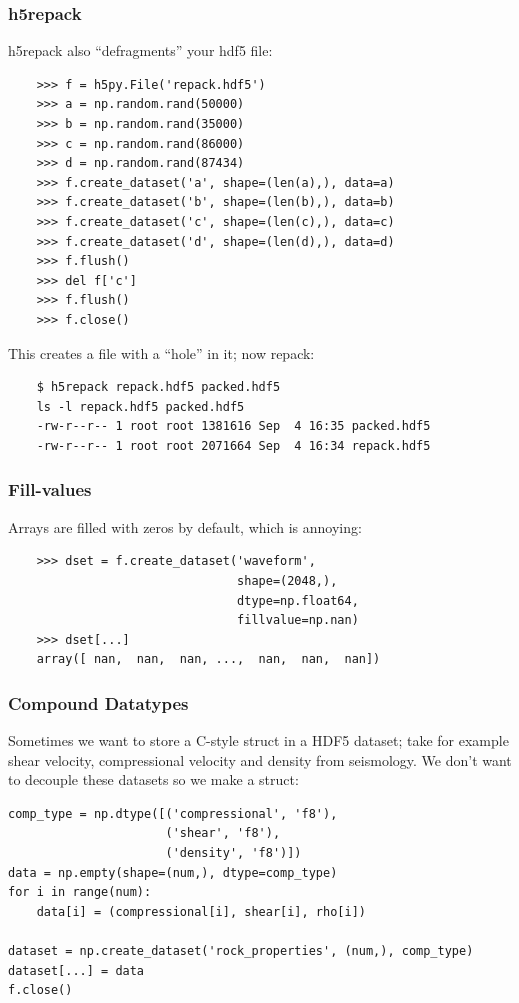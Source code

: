 \documentclass[9pt]{beamer}
\begin{document}
\begin{frame}[fragile]
  \frametitle{h5repack}
  h5repack also ``defragments'' your hdf5 file:
  \begin{verbatim}
    >>> f = h5py.File('repack.hdf5')
    >>> a = np.random.rand(50000)
    >>> b = np.random.rand(35000)
    >>> c = np.random.rand(86000)
    >>> d = np.random.rand(87434)
    >>> f.create_dataset('a', shape=(len(a),), data=a)
    >>> f.create_dataset('b', shape=(len(b),), data=b)
    >>> f.create_dataset('c', shape=(len(c),), data=c)
    >>> f.create_dataset('d', shape=(len(d),), data=d)
    >>> f.flush()
    >>> del f['c']
    >>> f.flush()
    >>> f.close()
  \end{verbatim}
  This creates a file with a ``hole'' in it; now repack:
  \begin{verbatim}
    $ h5repack repack.hdf5 packed.hdf5
    ls -l repack.hdf5 packed.hdf5
    -rw-r--r-- 1 root root 1381616 Sep  4 16:35 packed.hdf5
    -rw-r--r-- 1 root root 2071664 Sep  4 16:34 repack.hdf5
  \end{verbatim}
  
\end{frame}


\begin{frame}[fragile]
  \frametitle{Fill-values}
  Arrays are filled with zeros by default, which is annoying:
  \begin{verbatim}
    >>> dset = f.create_dataset('waveform',
                                shape=(2048,),
                                dtype=np.float64,
                                fillvalue=np.nan)
    >>> dset[...]
    array([ nan,  nan,  nan, ...,  nan,  nan,  nan])
  \end{verbatim}
\end{frame}

\begin{frame}[fragile]
\frametitle{Compound Datatypes}
Sometimes we want to store a C-style struct in a HDF5 dataset; take for example shear velocity, compressional velocity and density from seismology. We don't want to decouple these datasets so we make a struct:
\begin{verbatim}
comp_type = np.dtype([('compressional', 'f8'),
                      ('shear', 'f8'),
                      ('density', 'f8')])
data = np.empty(shape=(num,), dtype=comp_type)
for i in range(num):
    data[i] = (compressional[i], shear[i], rho[i])

dataset = np.create_dataset('rock_properties', (num,), comp_type)
dataset[...] = data
f.close()
\end{verbatim}
\end{frame}
\end{document}
